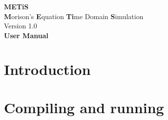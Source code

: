 \documentclass[12pt]{report}
\begin{document}
\begin{titlepage}
	\vspace*{5cm}
    \begin{center}
%
		{\Huge {}\selectfont \textbf{METiS}} \\[15pt]		
		{\LARGE {}\selectfont \textbf{M}orison's \textbf{E}quation \textbf{Ti}me Domain \textbf{S}imulation} \\[20pt]
		\vspace*{\fill}
%
%		
		{\LARGE {}\selectfont Version 1.0} \\[8pt]		
		{\huge {}\selectfont \textbf{User Manual}}		
    \end{center} 
    \vspace*{1cm}
\end{titlepage}



\tableofcontents

\chapter{Introduction}
\lipsum



\chapter{Compiling and running}

\nocite{*}


\end{document}
